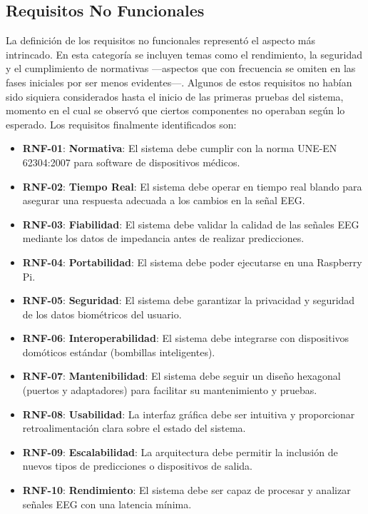 \newpage

\subsection{Requisitos No Funcionales}

La definición de los requisitos no funcionales representó el aspecto más intrincado. En esta categoría se incluyen temas como el rendimiento, la seguridad y el cumplimiento de normativas —aspectos que con frecuencia se omiten en las fases iniciales por ser menos evidentes—. Algunos de estos requisitos no habían sido siquiera considerados hasta el inicio de las primeras pruebas del sistema, momento en el cual se observó que ciertos componentes no operaban según lo esperado. Los requisitos finalmente identificados son:

\begin{itemize}
    \item \textbf{RNF-01}: \textbf{Normativa}: El sistema debe cumplir con la norma UNE-EN 62304:2007 para software de dispositivos médicos.\label{rnf-01}
    \item \textbf{RNF-02}: \textbf{Tiempo Real}: El sistema debe operar en tiempo real blando para asegurar una respuesta adecuada a los cambios en la señal EEG.\label{rnf-02}
    \item \textbf{RNF-03}: \textbf{Fiabilidad}: El sistema debe validar la calidad de las señales EEG mediante los datos de impedancia antes de realizar predicciones.\label{rnf-03}
    \item \textbf{RNF-04}: \textbf{Portabilidad}: El sistema debe poder ejecutarse en una Raspberry Pi.\label{rnf-04}
    \item \textbf{RNF-05}: \textbf{Seguridad}: El sistema debe garantizar la privacidad y seguridad de los datos biométricos del usuario.\label{rnf-05}
    \item \textbf{RNF-06}: \textbf{Interoperabilidad}: El sistema debe integrarse con dispositivos domóticos estándar (bombillas inteligentes).\label{rnf-06}
    \item \textbf{RNF-07}: \textbf{Mantenibilidad}: El sistema debe seguir un diseño hexagonal (puertos y adaptadores) para facilitar su mantenimiento y pruebas.\label{rnf-07}
    \item \textbf{RNF-08}: \textbf{Usabilidad}: La interfaz gráfica debe ser intuitiva y proporcionar retroalimentación clara sobre el estado del sistema.\label{rnf-08}
    \item \textbf{RNF-09}: \textbf{Escalabilidad}: La arquitectura debe permitir la inclusión de nuevos tipos de predicciones o dispositivos de salida.\label{rnf-09}
    \item \textbf{RNF-10}: \textbf{Rendimiento}: El sistema debe ser capaz de procesar y analizar señales EEG con una latencia mínima.\label{rnf-10}
\end{itemize}

